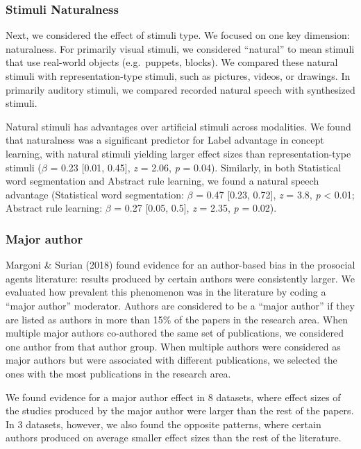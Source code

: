 \documentclass[10pt, letterpaper]{article}
\begin{document}
\hypertarget{stimuli-naturalness}{%
\subsubsection{Stimuli Naturalness}\label{stimuli-naturalness}}

Next, we considered the effect of stimuli type. We focused on one key
dimension: naturalness. For primarily visual stimuli, we considered
``natural'' to mean stimuli that use real-world objects (e.g.~puppets,
blocks). We compared these natural stimuli with representation-type
stimuli, such as pictures, videos, or drawings. In primarily auditory
stimuli, we compared recorded natural speech with synthesized stimuli.

Natural stimuli has advantages over artificial stimuli across
modalities. We found that naturalness was a significant predictor for
Label advantage in concept learning, with natural stimuli yielding
larger effect sizes than representation-type stimuli (\(\beta\) = 0.23
{[}0.01, 0.45{]}, \emph{z} = 2.06, \emph{p} = 0.04). Similarly, in both
Statistical word segmentation and Abstract rule learning, we found a
natural speech advantage (Statistical word segmentation: \(\beta\) =
0.47 {[}0.23, 0.72{]}, \emph{z} = 3.8, \emph{p} \textless{} 0.01;
Abstract rule learning: \(\beta\) = 0.27 {[}0.05, 0.5{]}, \emph{z} =
2.35, \emph{p} = 0.02).

\hypertarget{major-author}{%
\subsubsection{Major author}\label{major-author}}

Margoni \& Surian (2018) found evidence for an author-based bias in the
prosocial agents literature: results produced by certain authors were
consistently larger. We evaluated how prevalent this phenomenon was in
the literature by coding a ``major author'' moderator. Authors are
considered to be a ``major author'' if they are listed as authors in
more than 15\% of the papers in the research area. When multiple major
authors co-authored the same set of publications, we considered one
author from that author group. When multiple authors were considered as
major authors but were associated with different publications, we
selected the ones with the most publications in the research area.

We found evidence for a major author effect in 8 datasets, where effect
sizes of the studies produced by the major author were larger than the
rest of the papers. In 3 datasets, however, we also found the opposite
patterns, where certain authors produced on average smaller effect sizes
than the rest of the literature.
\end{document}
